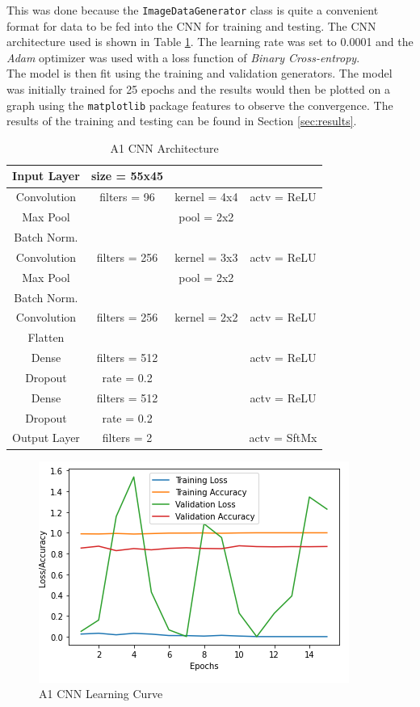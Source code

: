 \documentclass{article}
\begin{document}
 	This was done because the \verb|ImageDataGenerator| class is quite a convenient format for data to be fed into the CNN for training and testing. The CNN architecture used is shown in Table \ref{table:A1_Arch}. The learning rate was set to 0.0001 and the \textit{Adam} optimizer was used with a loss function of \textit{Binary Cross-entropy}.\\
 	
 	 The model is then fit using the training and validation generators. The model was initially trained for 25 epochs and the results would then be plotted on a graph using the \verb|matplotlib| package features to observe the convergence. The results of the training and testing can be found in Section \ref{sec:results}.
 	
 	\begin{table}[]
 		\begin{tabular}{|c|c c c|}
 			\hline
 			Input Layer & size = 55x45 	&				&	\\
 			\hline
 			Convolution & filters = 96 	& kernel = 4x4 	& actv = ReLU\\
 			\hline
 			Max Pool	&				& pool = 2x2  	& \\
 			\hline
 			Batch Norm. & 				&				&\\
 			\hline
 			Convolution & filters = 256 & kernel = 3x3 	& actv = ReLU\\
 			\hline
 			Max Pool	&				& pool = 2x2	&\\
 			\hline
 			Batch Norm. &				&				&\\
 			\hline
 			Convolution & filters = 256 & kernel = 2x2	& actv = ReLU\\
 			\hline
 			Flatten 	& 				& 				&\\
 			\hline
 			Dense 		& filters = 512 &				& actv = ReLU\\
 			\hline
 			Dropout 	&	rate = 0.2 	&	 			&\\
 			\hline
 			Dense 		& filters = 512 &				& actv = ReLU\\
 			\hline
 			Dropout 	& rate = 0.2 	& 				&\\
 			\hline
 			Output Layer& filters = 2 	&				& actv = SftMx\\
 			\hline
 		\end{tabular}
 	\caption{A1 CNN Architecture}
 	\label{table:A1_Arch}
 	\end{table} 
    \begin{figure}[htb]
		\centering
		\includegraphics[scale=0.7]{Figures/A1_CNN_Graph.PNG}
		\caption{A1 CNN Learning Curve}
		\label{fig:A1_curve}
	\end{figure} 	
\end{document}
